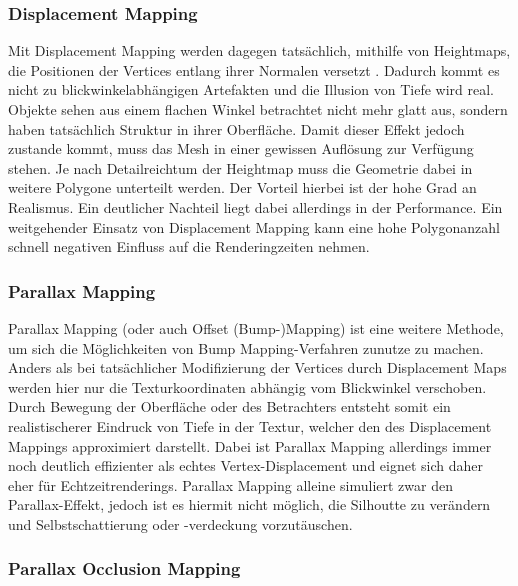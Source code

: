 \subsubsection{Displacement Mapping}
Mit Displacement Mapping werden dagegen tatsächlich, mithilfe von Heightmaps, die Positionen
der Vertices entlang ihrer Normalen versetzt \parencite{Cook1984,Cook1987}. Dadurch kommt es nicht zu blickwinkelabhängigen Artefakten
und die Illusion von Tiefe wird real. Objekte sehen aus einem flachen Winkel betrachtet nicht mehr
glatt aus, sondern haben tatsächlich Struktur in ihrer Oberfläche. Damit dieser Effekt jedoch zustande kommt,
muss das Mesh in einer gewissen Auflösung zur Verfügung stehen. Je nach Detailreichtum der Heightmap
muss die Geometrie dabei in weitere Polygone unterteilt werden. Der Vorteil hierbei ist der hohe
Grad an Realismus. Ein deutlicher Nachteil liegt dabei allerdings in der Performance.
Ein weitgehender Einsatz von Displacement Mapping kann eine hohe Polygonanzahl schnell
negativen Einfluss auf die Renderingzeiten nehmen. 


\subsubsection{Parallax Mapping}

Parallax Mapping (oder auch Offset (Bump-)Mapping) ist eine weitere Methode, um sich die Möglichkeiten von
Bump Mapping-Verfahren zunutze zu machen. Anders als bei tatsächlicher Modifizierung der Vertices
durch Displacement Maps werden hier nur die Texturkoordinaten abhängig vom Blickwinkel verschoben. \parencite{Kaneko2001, Welsh2004}
Durch Bewegung der Oberfläche oder des Betrachters entsteht somit ein realistischerer Eindruck
von Tiefe in der Textur, welcher den des Displacement Mappings approximiert darstellt.
Dabei ist Parallax Mapping allerdings immer noch deutlich effizienter als echtes Vertex-Displacement
und eignet sich daher eher für Echtzeitrenderings.
Parallax Mapping alleine simuliert zwar den Parallax-Effekt, jedoch ist es hiermit nicht möglich, die Silhoutte zu verändern und
Selbstschattierung oder -verdeckung vorzutäuschen.


\subsubsection{Parallax Occlusion Mapping}
\label{sec:3.3.4}


